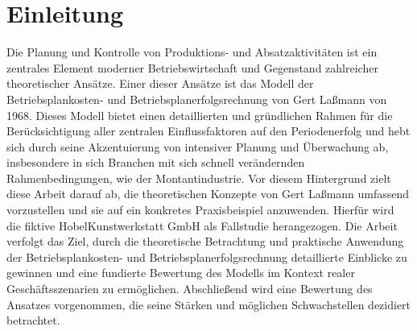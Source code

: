 \chapter{Einleitung}

Die Planung und Kontrolle von Produktions- und Absatzaktivitäten ist ein zentrales Element moderner Betriebswirtschaft und Gegenstand zahlreicher theoretischer Ansätze. Einer dieser Ansätze ist das Modell der Betriebsplankosten- und Betriebsplanerfolgsrechnung von Gert La{\ss}mann von 1968. Dieses Modell bietet einen detaillierten und gründlichen Rahmen für die Berücksichtigung aller zentralen Einflussfaktoren auf den Periodenerfolg und hebt sich durch seine Akzentuierung von intensiver Planung und Überwachung ab, insbesondere in sich Branchen mit sich schnell verändernden Rahmenbedingungen, wie der Montantindustrie. Vor diesem Hintergrund zielt diese Arbeit darauf ab, die theoretischen Konzepte von Gert La{\ss}mann umfassend vorzustellen und sie auf ein konkretes Praxisbeispiel anzuwenden. Hierfür wird die fiktive HobelKunstwerkstatt GmbH als Fallstudie herangezogen. Die Arbeit verfolgt das Ziel, durch die theoretische Betrachtung und praktische Anwendung der Betriebsplankosten- und Betriebsplanerfolgsrechnung detaillierte Einblicke zu gewinnen und eine fundierte Bewertung des Modells im Kontext realer Geschäftsszenarien zu ermöglichen. Abschlie{\ss}end wird eine Bewertung des Ansatzes vorgenommen, die seine Stärken und möglichen Schwachstellen dezidiert betrachtet.
